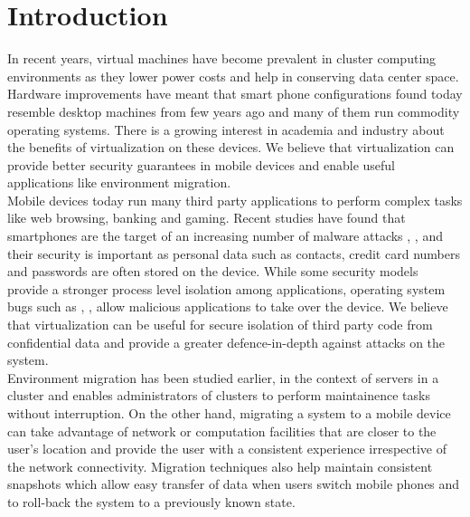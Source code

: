 \section{Introduction}
In recent years, virtual machines have become prevalent in cluster computing environments \cite{gartner2009virtual} as they lower power costs and help in conserving data center space. Hardware improvements have meant that smart phone configurations found today resemble desktop machines from few years ago and many of them run commodity operating systems. There is a growing interest in academia \cite{cox2007pocket} and industry \cite{vmware2009nextfrontier} about the benefits of virtualization on these devices. We believe that virtualization can provide better security guarantees in mobile devices and enable useful applications like environment migration. \\

Mobile devices today run many third party applications to perform complex tasks like web browsing, banking and gaming. Recent studies have found that smartphones are the target of an increasing number of malware attacks \cite{bose2006mobile},  \cite{cybercriminals2007banks},  \cite{iphone2010seriot} and their security is important as personal data such as contacts, credit card numbers and passwords are often stored on the device. While some security models \cite{androidsecurity} provide a stronger process level isolation among applications, operating system bugs such as \cite{kernel2009vulnerability}, \cite{opencore2009android}, \cite{sms2009iphone} allow malicious applications to take over the device. We believe that virtualization can be useful for secure isolation of third party code from confidential data and provide a greater defence-in-depth against attacks on the system.\\

Environment migration has been studied earlier, in the context of servers in a cluster \cite{clark2005live} and enables administrators of clusters to perform maintainence tasks without interruption. On the other hand, migrating a system to a mobile device can take advantage of network or computation facilities that are closer to the user's location and provide the user with a consistent experience irrespective of the network connectivity. Migration techniques also help maintain consistent snapshots which allow easy transfer of data when users switch mobile phones and to roll-back the system to a previously known state.\\


